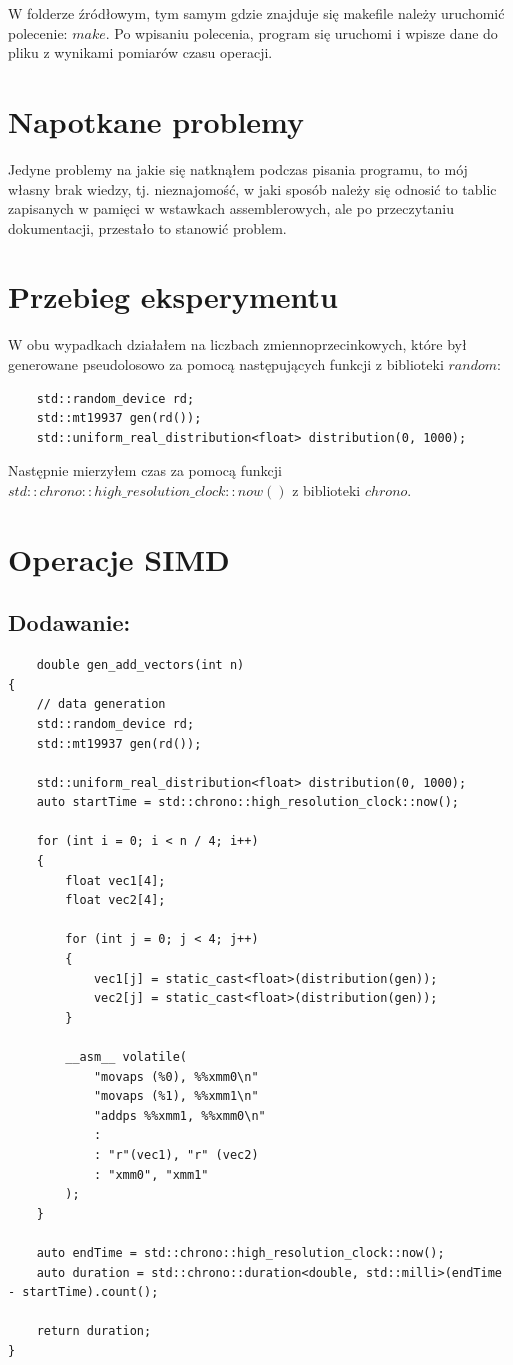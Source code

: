 \documentclass{article}
\begin{document}
W folderze źródłowym, tym samym gdzie znajduje się makefile należy uruchomić polecenie: $make$.
Po wpisaniu polecenia, program się uruchomi i wpisze dane do pliku z wynikami pomiarów czasu operacji.

\section{Napotkane problemy}
Jedyne problemy na jakie się natknąłem podczas pisania programu, to mój własny brak wiedzy, tj. nieznajomość, w jaki sposób należy się odnosić 
to tablic zapisanych w pamięci w wstawkach assemblerowych, ale po przeczytaniu dokumentacji, przestało to stanowić problem.

\section{Przebieg eksperymentu}

W obu wypadkach działałem na liczbach zmiennoprzecinkowych, które był generowane pseudolosowo
za pomocą następujących funkcji z biblioteki $random$:

\begin{verbatim}
    std::random_device rd;
    std::mt19937 gen(rd());
    std::uniform_real_distribution<float> distribution(0, 1000);
\end{verbatim}

Następnie mierzyłem czas za pomocą funkcji $std::chrono::high\_resolution\_clock::now()$ z biblioteki $chrono$.

\section{Operacje SIMD}

\subsection{Dodawanie:}
\begin{verbatim}
    double gen_add_vectors(int n)
{
    // data generation
    std::random_device rd;
    std::mt19937 gen(rd());

    std::uniform_real_distribution<float> distribution(0, 1000);
    auto startTime = std::chrono::high_resolution_clock::now();

    for (int i = 0; i < n / 4; i++)
    {
        float vec1[4];
        float vec2[4];

        for (int j = 0; j < 4; j++)
        {
            vec1[j] = static_cast<float>(distribution(gen));
            vec2[j] = static_cast<float>(distribution(gen));
        }

        __asm__ volatile(
            "movaps (%0), %%xmm0\n"
            "movaps (%1), %%xmm1\n"
            "addps %%xmm1, %%xmm0\n" 
            :                       
            : "r"(vec1), "r" (vec2)
            : "xmm0", "xmm1" 
        );
    }

    auto endTime = std::chrono::high_resolution_clock::now();
    auto duration = std::chrono::duration<double, std::milli>(endTime - startTime).count();

    return duration;
}
\end{verbatim}
\end{document}
